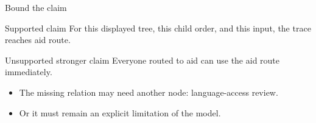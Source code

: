 \begin{frame}{Bound the claim}
\begin{block}{Supported claim}
For this displayed tree, this child order, and this input, the trace reaches aid route.
\end{block}
\begin{alertblock}{Unsupported stronger claim}
Everyone routed to aid can use the aid route immediately.
\end{alertblock}
\begin{itemize}
\item The missing relation may need another node: language-access review.
\item Or it must remain an explicit limitation of the model.
\end{itemize}
\end{frame}

